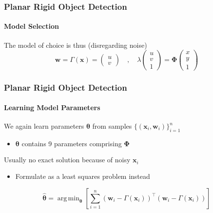 \documentclass[xetex,professionalfont]{beamer}
\DeclareMathOperator*{\argmin}{arg\,min}
\renewcommand{\vec}[1]{\ensuremath{\mathbf{#1}}}
\newcommand{\vw}{\vec{w}}
\newcommand{\vx}{\vec{x}}
\newcommand{\bth}{\boldsymbol{\theta}}
\renewcommand\emph[1]{\textcolor{tuwcvl_inf_red}{#1}}
\begin{document}
\begin{frame}
\frametitle{Planar Rigid Object Detection}
\framesubtitle{Model Selection}

The model of choice is thus (disregarding noise)  %
\[
	\vw=\Gamma(\vx)=
	\begin{pmatrix}
		u \\ v
	\end{pmatrix}\quad,\quad
	\lambda
	\begin{pmatrix}
		u \\ v \\ 1
	\end{pmatrix}
	= \boldsymbol{\Phi}
	\begin{pmatrix}
		x \\ y \\ 1
	\end{pmatrix}
\]

\end{frame}


\begin{frame}
\frametitle{Planar Rigid Object Detection}
\framesubtitle{Learning Model Parameters}

We again learn parameters $\bth$ from samples $\{(\vx_i,\vw_i)\}_{i=1}^n$
\begin{itemize}
	\item $\bth$ contains 9 parameters comprising $\boldsymbol{\Phi}$ %
\end{itemize}

\bigskip
Usually no exact solution because of noisy $\vx_i$
\begin{itemize}
	\item Formulate as a \emph{least squares problem} instead
\end{itemize}

\[
	\hat{\bth}=\argmin_{\bth} \left[\sum_{i=1}^n (\vw_i-\Gamma(\vx_i))^\top(\vw_i-\Gamma(\vx_i)) \right]
\]

\end{frame}

\end{document}
